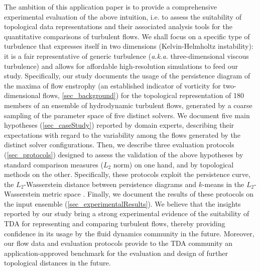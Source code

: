 The ambition of this application paper is to provide a comprehensive
experimental evaluation of
the above intuition, i.e. to assess the suitability of
topological data representations and their associated analysis tools for the
quantitative comparisons of turbulent flows.
We shall focus on a specific type of turbulence that expresses itself in two dimensions (Kelvin-Helmholtz instability): it is a fair representative of generic turbulence (\emph{a.k.a.} three-dimensional viscous turbulence) and allows for affordable high-resolution simulations to feed our study.
Specifically, our study documents
the usage of the persistence diagram of the maxima of flow enstrophy (an established indicator of vorticity for two-dimensional flows,
\autoref{sec_background}) for the topological representation of 180 members of
an ensemble of hydrodynamic turbulent flows, generated by a coarse sampling of
the parameter space of five distinct solvers.
We document five main hypotheses (\autoref{sec_caseStudy}) reported by domain
experts, describing their expectations with regard to the variability among the
flows generated by the distinct solver configurations.
Then, we describe three evaluation protocols (\autoref{sec_protocols}) designed
to assess the validation of the above hypotheses by standard comparison
measures ($L_2$ norm) on one hand, and by topological methods on the other.
Specifically, these protocols exploit the persistence curve, the
$L_2$-Wasserstein distance between persistence diagrams \cite{Turner2014} and
$k$-means in the $L_2$-Wasserstein metric space \cite{vidal_vis19}. Finally, we
document
the
results of these
protocols on the input ensemble
(\autoref{sec_experimentalResults}). We believe that the insights reported by
our study bring a strong experimental evidence of the suitability
of TDA for representing and comparing turbulent flows, thereby providing
confidence in its usage by the fluid dynamics community in the future.
Moreover, our flow data and evaluation protocols provide to the TDA community
an application-approved benchmark for the evaluation and design of further
topological distances in the future.

